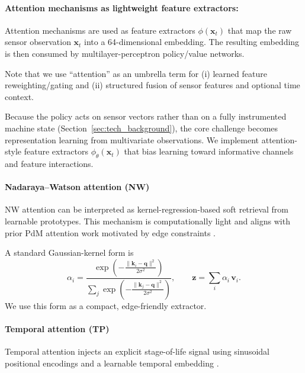 \documentclass[sn-basic]{sn-jnl} %
\begin{document}
\paragraph{Attention mechanisms as lightweight feature extractors:}
\label{sec:attention}

Attention mechanisms are used as feature extractors $\phi(\mathbf{x}_t)$ that map the raw sensor observation $\mathbf{x}_t$ into a 64-dimensional embedding. The resulting embedding is then consumed by multilayer-perceptron policy/value networks.

Note that we use ``attention'' as an umbrella term for (i) learned feature reweighting/gating and (ii) structured fusion of sensor features and optional time context.

Because the policy acts on sensor vectors rather than on a fully instrumented machine state (Section~\ref{sec:tech_background}), the core challenge becomes representation learning from multivariate observations. We implement attention-style feature extractors $\phi_\theta(\mathbf{x}_t)$ that bias learning toward informative channels and feature interactions.

\paragraph{Nadaraya--Watson attention (NW)}
NW attention can be interpreted as kernel-regression-based soft retrieval from learnable prototypes. This mechanism is computationally light and aligns with prior PdM attention work motivated by edge constraints \cite{Siraskar2024}.

A standard Gaussian-kernel form is
\begin{equation}
\alpha_i = \frac{\exp\left(-\tfrac{\lVert \mathbf{k}_i-\mathbf{q}\rVert^2}{2\sigma^2}\right)}{\sum_j \exp\left(-\tfrac{\lVert \mathbf{k}_j-\mathbf{q}\rVert^2}{2\sigma^2}\right)},
\qquad \mathbf{z}=\sum_i\alpha_i\,\mathbf{v}_i.
\end{equation}
We use this form as a compact, edge-friendly extractor.

\paragraph{Temporal attention (TP)}
Temporal attention injects an explicit stage-of-life signal using sinusoidal positional encodings and a learnable temporal embedding \cite{Vaswani2017, Lim2020TFT}.
\end{document}
